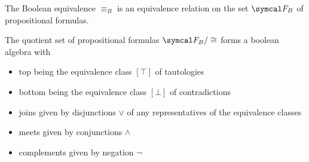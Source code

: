\begin{proposition}\label{thm:boolean_equivalence_relation}
  The Boolean equivalence \( \equiv_B \) is an equivalence relation on the set \( \Cal{F}_B \) of propositional formulas.
\end{proposition}

\begin{theorem}\label{thm:propositional_logic_boolean_algebra}
  The quotient set of propositional formulas \( \Cal{F}_B / \cong \) forms a boolean algebra with
  \begin{itemize}
    \item top being the equivalence class \( [\top] \) of tautologies
    \item bottom being the equivalence class \( [\bot] \) of contradictions
    \item joins given by disjunctions \( \lor \) of any representatives of the equivalence classes
    \item meets given by conjunctions \( \land \)
    \item complements given by negation \( \neg \)
  \end{itemize}
\end{theorem}
